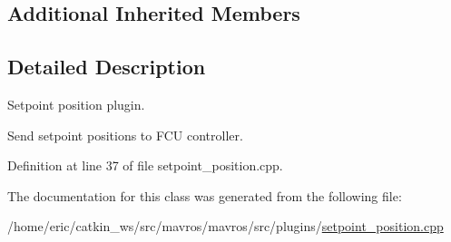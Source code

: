 \subsection*{Additional Inherited Members}


\subsection{Detailed Description}
Setpoint position plugin. 

Send setpoint positions to F\+CU controller. 

Definition at line 37 of file setpoint\+\_\+position.\+cpp.



The documentation for this class was generated from the following file\+:\begin{DoxyCompactItemize}
\item 
/home/eric/catkin\+\_\+ws/src/mavros/mavros/src/plugins/\mbox{\hyperlink{setpoint__position_8cpp}{setpoint\+\_\+position.\+cpp}}\end{DoxyCompactItemize}
